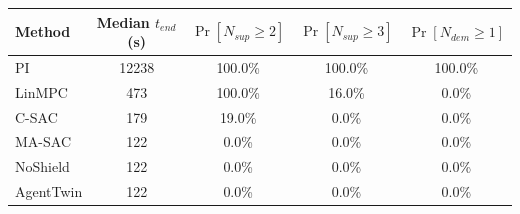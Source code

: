 \begin{tabular}{lcccc}
\toprule
Method & Median $t_{end}$ (s) & $\Pr[N_{sup}\ge2]$ & $\Pr[N_{sup}\ge3]$ & $\Pr[N_{dem}\ge1]$\\
\midrule
PI & 12238 & 100.0\% & 100.0\% & 100.0\%\\
LinMPC & 473 & 100.0\% & 16.0\% & 0.0\%\\
C-SAC & 179 & 19.0\% & 0.0\% & 0.0\%\\
MA-SAC & 122 & 0.0\% & 0.0\% & 0.0\%\\
NoShield & 122 & 0.0\% & 0.0\% & 0.0\%\\
AgentTwin & 122 & 0.0\% & 0.0\% & 0.0\%\\
\bottomrule
\end{tabular}